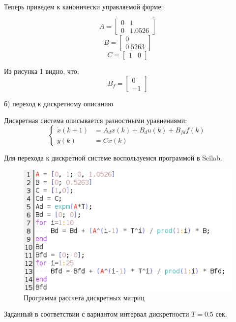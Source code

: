 \documentclass[a4paper,14pt]{extreport}
\begin{document}
Теперь приведем к канонически управляемой форме:

\begin{equation}
A=
\begin{bmatrix}
0&1\\
0& 1.0526
\end{bmatrix}
\end{equation}
\begin{equation}
B=
\begin{bmatrix}
0\\
0.5263
\end{bmatrix}
\end{equation}
\begin{equation}
C=
\begin{bmatrix}
1&0
\end{bmatrix}
\end{equation}

Из рисунка 1 видно, что:
\begin{equation}
B_f=
\begin{bmatrix}
0\\
-1
\end{bmatrix}
\end{equation}

б) переход к дискретному описанию

Дискретная система описывается разностными уравнениями:
\begin{equation}
\begin{cases}
\dot x(k+1) &= A_d x(k) + B_d u(k) + B_{fd} f(k)\\
y(k) &= C x(k)
\end{cases}
\end{equation}

Для перехода к дискретной системе воспользуемся программой в Scilab.
	\begin{figure}[H]
	\center\includegraphics[width=0.5\linewidth]{pr.png}
	\caption{Программа рассчета дискретных матриц}
	\label{fig:scr1}
\end{figure}

Заданный в соответствии с вариантом интервал дискретности $T = 0.5$ сек.
\end{document}
